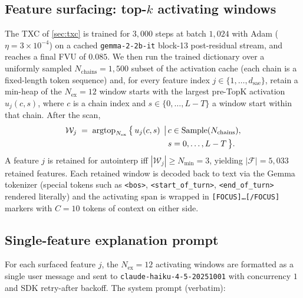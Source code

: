 \subsection{Feature surfacing: top-$k$ activating windows}
\label{app:meta-topk}
The TXC of \cref{sec:txc} is trained for $3{,}000$ steps at batch $1{,}024$ with Adam ($\eta{=}3\!\times\!10^{-4}$) on a cached \texttt{gemma-2-2b-it} block-13 post-residual stream, and reaches a final FVU of $0.085$. We then run the trained dictionary over a uniformly sampled $N_{\text{chains}}{=}1{,}500$ subset of the activation cache (each chain is a fixed-length token sequence) and, for every feature index $j\in\{1,\ldots,d_{\text{sae}}\}$, retain a min-heap of the $N_{\text{ex}}{=}12$ window starts with the largest pre-TopK activation $u_{j}(c, s)$, where $c$ is a chain index and $s\in\{0,\ldots,L{-}T\}$ a window start within that chain. After the scan,
\begin{equation}
    \begin{aligned}
    \mathcal{W}_j \;=\; \mathrm{argtop}_{N_{\text{ex}}}\,\bigl\{\,u_j(c, s)\,\bigm|\,
    &c\in\mathrm{Sample}(N_{\text{chains}}), \\
    &s=0,\ldots,L-T\,\bigr\}.
    \end{aligned}
\end{equation}
A feature $j$ is retained for autointerp iff $|\mathcal{W}_j|\geq N_{\min}=3$, yielding $|\mathcal{F}|=5{,}033$ retained features. Each retained window is decoded back to text via the Gemma tokenizer (special tokens such as \texttt{<bos>}, \texttt{<start\_of\_turn>}, \texttt{<end\_of\_turn>} rendered literally) and the activating span is wrapped in \texttt{[FOCUS]\ldots[/FOCUS]} markers with $C{=}10$ tokens of context on either side.

\subsection{Single-feature explanation prompt}
\label{app:meta-prompt}
For each surfaced feature $j$, the $N_{\text{ex}}=12$ activating windows are formatted as a single user message and sent to \texttt{claude-haiku-4-5-20251001} \citep{haiku} with concurrency $1$ and SDK retry-after backoff. The system prompt (verbatim):

